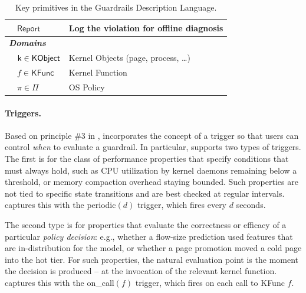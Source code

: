 \begin{table}[t]
\begin{tabular}{c l p{4.8cm}}
  & $\textsf{Report}$ & Log the violation for offline diagnosis \\
\midrule
\multicolumn{3}{l}{\bf \textit{Domains}}\\
  & $\textsf k \in \textsf{KObject}$ & Kernel Objects (page, process, \ldots) \\
  & $f \in \textsf{KFunc}$ & Kernel Function \\
  & $\pi \in \Pi$ & OS Policy \\
\bottomrule
\end{tabular}
\caption{Key primitives in the Guardrails Description Language.}
\vspace{-20pt}
\label{tab:gdl-primitives}
\end{table}


\paragraph{Triggers.} 
Based on principle \#3 in , \lang incorporates the concept of a trigger so that users can control \emph{when} to evaluate a guardrail.
In particular, \lang supports two types of triggers.
The first is for the class of performance properties that specify conditions that must always hold, such as CPU utilization by kernel daemons remaining below a threshold, or memory compaction overhead staying bounded.
Such properties are not tied to specific state transitions and are best checked at regular intervals.
\lang captures this with the {\sf periodic}$(d)$ trigger, which fires every $d$ seconds.

The second type is for properties that evaluate the correctness or efficacy of a particular \emph{policy decision}: e.g., whether a flow-size prediction used features that are in-distribution for the model, or whether a page promotion moved a cold page into the hot tier.
For such properties, the natural evaluation point is the moment the decision is produced -- at the invocation of the relevant kernel function.
\lang captures this with the {\sf on\_call}$(f)$ trigger, which fires on each call to \textsf{KFunc} $f$.

